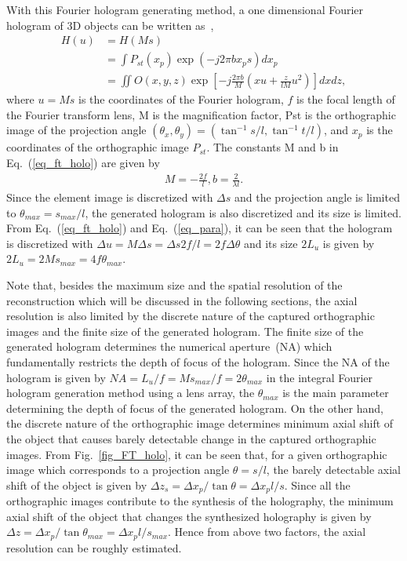 \documentclass[10pt,letterpaper]{article}
\begin{document}
With this Fourier hologram generating method, a one dimensional Fourier hologram of 3D objects can be written as~\cite{Park_2009_OE},
\begin{equation}
\begin{aligned}
H(u) & = H(Ms) \\
     & = \int P_{st}(x_p)\exp(-j2\pi b x_p s)d x_p  \\
     & = \iint{O(x,y,z)\exp \left[-j\frac{2\pi b}{M}\left(xu + \frac{z}{lM}{u^2} \right) \right]dxdz,} 
\end{aligned}
\label{eq_ft_holo}
\end{equation}
where $u= Ms$ is the coordinates of the Fourier hologram, $f$ is the focal length of the Fourier transform lens, M is the magnification factor, Pst is the orthographic image of the projection angle $(\theta_x, \theta_y)=(\tan^{-1}s/l, \tan^{-1}t/l)$, and $x_p$ is the coordinates of the orthographic image $P_{st}$. The constants M and b in Eq.~(\ref{eq_ft_holo}) are given by~\cite{Park_2009_OE}
\begin{equation}
\begin{aligned}
 M = -\frac{2f}{l}, b = \frac{2}{\lambda l}.
\end{aligned}
\label{eq_para}
\end{equation}
Since the element image is discretized with $\Delta s$ and the projection angle is limited to $\theta_{max}=s_{max}/l$, the generated hologram is also discretized and its size is limited. From Eq.~(\ref{eq_ft_holo}) and Eq.~(\ref{eq_para}), it can be seen that the hologram is discretized with $\Delta u=M\Delta s=\Delta s 2f/l=2f\Delta\theta$ and its size $2L_u$ is given by $2L_u=2Ms_{max}=4f \theta_{max}$.  

Note that, besides the maximum size and the spatial resolution of the reconstruction which will be discussed in the following sections, the axial resolution is also limited by the discrete nature of the captured orthographic images and the finite size of the generated hologram. The finite size of the generated hologram determines the numerical aperture~(NA) which fundamentally restricts the depth of focus of the hologram. Since the NA of the hologram is given by $NA=L_u/f=Ms_{max}/f=2\theta_{max}$ in the integral Fourier hologram generation method using a lens array, the $\theta_{max}$ is the main parameter determining the depth of focus of the generated hologram. On the other hand, the discrete nature of the orthographic image determines minimum axial shift of the object that causes barely detectable change in the captured orthographic images. From Fig.~\ref{fig_FT_holo}, it can be seen that, for a given orthographic image which corresponds to a projection angle $\theta=s/l$, the barely detectable axial shift of the object is given by $\Delta z_s=\Delta x_p/\tan\theta=\Delta x_p l/s$. Since all the orthographic images contribute to the synthesis of the holography, the minimum axial shift of the object that changes the synthesized holography is given by $\Delta z=\Delta x_p/\tan\theta_{max}=\Delta x_p l/s_{max}$. Hence from above two factors, the axial resolution can be roughly estimated. 
\end{document}
